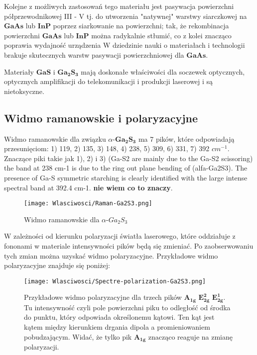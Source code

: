 Kolejne z możliwych zastosowań tego materiału jest pasywacja powierzchni półprzewodnikowej III - V tj. do utworzenia "natywnej" warstwy siarczkowej na $\mathbf{GaAs}$ lub $\mathbf{InP}$ poprzez siarkowanie na powierzchni; tak, że rekombinacja powierzchni $\mathbf{GaAs}$ lub $\mathbf{InP}$ można radykalnie stłumić, co z kolei znacząco poprawia wydajność urządzenia W dziedzinie nauki o materiałach i technologii brakuje skutecznych warstw pasywacji powierzchniowej  dla $\mathbf{GaAs}$.

Materiały $\mathbf{GaS}$ i $\mathbf{Ga_{2}S_{3}}$ mają doskonałe właściwości dla soczewek optycznych, optycznych amplifikacji do telekomunikacji i produkcji laserowej i są nietoksyczne.

\subsection{Widmo ramanowskie i polaryzacyjne}

Widmo ramanowskie dla związku $\alpha$-$\mathbf{Ga_{2}S_{3}}$ ma 7 pików, które odpowiadają przesunięciom: 1) 119, 2) 135, 3) 148, 4) 238, 5) 309, 6) 331, 7) 392 $cm^{-1}$. Znaczące piki takie jak 1), 2) i 3) (Ga-S2 are mainly due to the Ga-S2 scissoring) 
the band at 238 cm-1 is due to the ring out plane bending of (alfa-Ga2S3). The presence of Ga-S symmetric starching is clearly identified with the large intense spectral band at 392.4 cm-1. \textbf{nie wiem co to znaczy}.

\begin{figure}[H]
	\begin{center}
		\texttt{[image: Wlasciwosci/Raman-Ga2S3.png]}
		\caption{Widmo ramanowskie dla $\alpha$-$Ga_{2}S_{3}$}
	\end{center}
\end{figure}

W zależności od kierunku polaryzacji światła laserowego, które oddziałuje z fononami w materiale intensywności pików będą się zmieniać. Po zaobserwowaniu tych zmian można uzyskać widmo polaryzacyjne. Przykładowe widmo polaryzacyjne znajduje się poniżej:
 
\begin{figure}[H]
	\begin{center}
		\texttt{[image: Wlasciwosci/Spectre-polarization-Ga2S3.png]}
		\caption{Przykładowe widmo polaryzacyjne dla trzech pików $\mathbf{A_{1g}}$ $\mathbf{E_{2g}^{2}}$ $\mathbf{E_{2g}^{1}}$. Tu intensywność czyli pole powierzchni piku to odległość od środka do punktu, który odpowiada określonemu kątowi. Ten kąt jest kątem między kierunkiem drgania dipola a promieniowaniem pobudzającym. Widać, że tylko pik $\mathbf{A_{1g}}$ znacząco reaguje na zmianę polaryzacji.}
	\end{center}
\end{figure}

